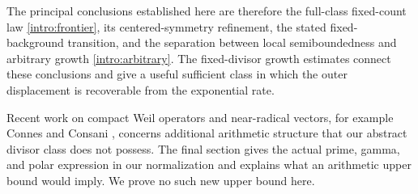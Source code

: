 The principal conclusions established here are therefore the
full-class fixed-count law \eqref{intro:frontier}, its
centered-symmetry refinement, the stated fixed-background
transition, and the separation between local
semiboundedness and arbitrary growth
\eqref{intro:arbitrary}. The fixed-divisor growth estimates
connect these conclusions and give a useful sufficient
class in which the outer displacement is recoverable
from the exponential rate.

Recent work on compact Weil operators and near-radical
vectors, for example Connes and Consani
\cite{ConnesConsani}, concerns additional arithmetic
structure that our abstract divisor class does not
possess. The final section gives the actual prime,
gamma, and polar expression in our normalization and
explains what an arithmetic upper bound
would imply. We prove no such new upper bound here.